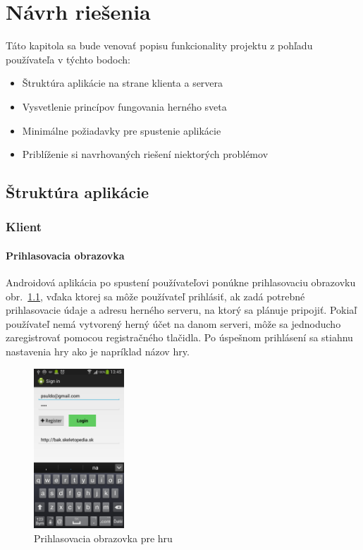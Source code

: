 \chapter{Návrh riešenia}
Táto kapitola sa bude venovať popisu funkcionality projektu z pohľadu používateľa v týchto bodoch:

\begin{itemize}
  \item Štruktúra aplikácie na strane klienta a servera
  \item Vysvetlenie princípov fungovania herného sveta
  \item Minimálne požiadavky pre spustenie aplikácie
  \item Priblíženie si navrhovaných riešení niektorých problémov
\end{itemize}



\section{Štruktúra aplikácie}
\subsection{Klient}
\subsubsection{Prihlasovacia obrazovka}
Androidová aplikácia po spustení používateľovi ponúkne prihlasovaciu obrazovku obr.~\ref{fig:klient_login}, vďaka ktorej sa môže používateľ prihlásiť, ak zadá potrebné prihlasovacie údaje a adresu herného serveru, na ktorý sa plánuje pripojiť. Pokiaľ používateľ nemá vytvorený herný účet na danom serveri, môže sa jednoducho zaregistrovať pomocou registračného tlačidla. Po úspešnom prihlásení sa stiahnu nastavenia hry ako je napríklad názov hry. 
\begin{figure}[h]
  \centering
  \includegraphics[height=6cm]{mainmatter/imgs/klient_login.png}
  \caption{Prihlasovacia obrazovka pre hru}
  \label{fig:klient_login}
\end{figure}
